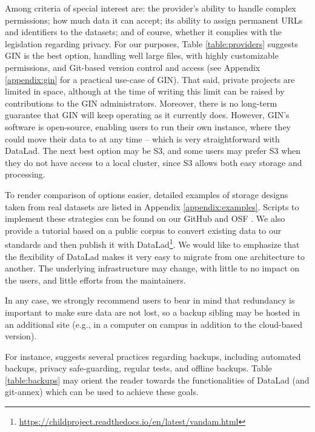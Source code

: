 \documentclass[smallextended]{svjour3}       %
\begin{document}
Among criteria of special interest are: the provider's ability to handle complex permissions; how much data it can accept; its ability to assign permanent URLs and identifiers to the datasets; and of course, whether it complies with the legislation regarding privacy. For our purposes, Table \ref{table:providers} suggests GIN is the best option, handling well large files, with highly customizable permissions, and Git-based version control and access (see Appendix \ref{appendix:gin} for a practical use-case of GIN). That said, private projects are limited in space, although at the time of writing this limit can be raised by contributions to the GIN administrators. Moreover, there is no long-term guarantee that GIN will keep operating as it currently does. However, GIN's software is open-source, enabling users to run their own instance, where they could move their data to at any time -- which is very straightforward with DataLad. The next best option may be S3, and some users may prefer S3 when they do not have access to a local cluster, since S3 allows both easy storage and processing. 

To render comparison of options easier, detailed examples of storage designs taken from real datasets are listed in Appendix \ref{appendix:examples}. Scripts to implement these strategies can be found on our GitHub and OSF \citep{datalad_procedures}. We also provide a tutorial based on a public corpus \citep{vandam-day} to convert existing data to our standards and then publish it with DataLad\footnote{\url{https://childproject.readthedocs.io/en/latest/vandam.html}}.
We would like to emphasize that the flexibility of DataLad makes it very easy to migrate from one architecture to another. The underlying infrastructure may change, with little to no impact on the users, and little efforts from the maintainers.

In any case, we strongly recommend users to bear in mind that redundancy is important to make sure data are not lost, so a backup sibling may be hosted in an additional site (e.g., in a computer on campus in addition to the cloud-based version). 

For instance, \citet{Perkel_2019} suggests several practices regarding backups, including automated backups, privacy safe-guarding, regular tests, and offline backups. Table \ref{table:backups} may orient the reader towards the functionalities of DataLad (and git-annex) which can be used to achieve these goals.
\end{document}
